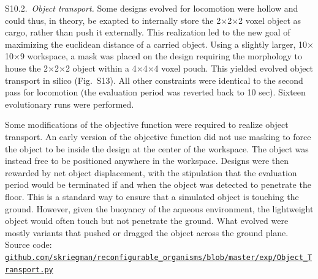 S10.2.~\textit{Object transport.}
Some designs evolved for locomotion were hollow and could thus, in theory, be exapted to internally store the 2{$\times$}2{$\times$}2 voxel object as cargo, rather than push it externally. 
This realization led to the new goal of maximizing the euclidean distance of a carried object. 
Using a slightly larger, 10{$\times$}10{$\times$}9 workspace, a mask was placed on the design requiring the morphology to house the 2{$\times$}2{$\times$}2 object within a 4{$\times$}4{$\times$}4 voxel pouch. 
This yielded evolved object transport in silico (Fig.~S13). All other constraints were identical to the second pass for locomotion (the evaluation period was reverted back to 10 sec). Sixteen evolutionary runs were performed.

Some modifications of the objective function were required to realize object transport. 
An early version of the objective function did not use masking to force the object to be inside the design at the center of the workspace. 
The object was instead free to be positioned anywhere in the workspace. 
Designs were then rewarded by net object displacement, with the stipulation that the evaluation period would be terminated if and when the object was detected to penetrate the floor. 
This is a standard way to ensure that a simulated object is touching the ground. 
However, given the buoyancy of the aqueous environment, the lightweight object would often touch but not penetrate the ground. 
What evolved were mostly variants that pushed or dragged the object across the ground plane. 
Source code:
\href{https://github.com/skriegman/reconfigurable_organisms/blob/master/exp/Object_Transport.py}{\scriptsize\tt\color{blue}github.com/skriegman/reconfigurable\_organisms/blob/master/exp/Object\_Transport.py}

\vspace{1em}

